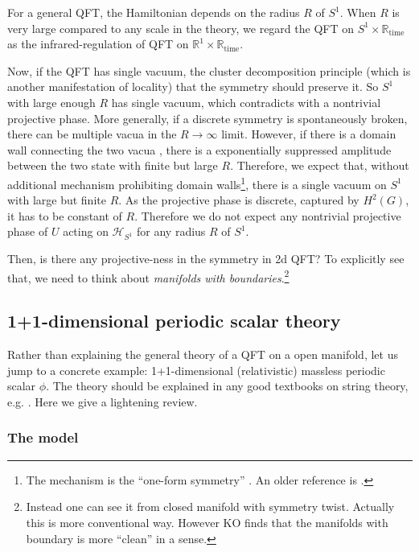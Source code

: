 \documentclass[
]{scrartcl}
\numberwithin{equation}{section}
\theoremstyle{definition}
\theoremstyle{definition}
\theoremstyle{definition}
\theoremstyle{definition}
\theoremstyle{remark}
\begin{document}
For a general QFT, the Hamiltonian depends on the radius \(R\) of \(S^1\).
When \(R\) is very large compared to any scale in the theory, we regard the QFT on \(S^1\times \mathbb{R}_\text{time}\) as the infrared-regulation of QFT on \(\mathbb{R}^1\times \mathbb{R}_\text{time}\).

Now, if the QFT has single vacuum, the cluster decomposition principle (which is another manifestation of locality) that the symmetry should preserve it. So \(S^1\) with large enough \(R\) has single vacuum, which contradicts with a nontrivial projective phase.
More generally, if a discrete symmetry is spontaneously broken,
there can be multiple vacua in the \(R\to \infty\) limit.
However, if there is a domain wall connecting the two vacua , there is a exponentially suppressed
amplitude between the two state with finite but large \(R\).
Therefore, we expect that, without additional mechanism prohibiting domain walls\footnote{The mechanism is the ``one-form symmetry'' \autocite{Komargodski:2020mxz}. An older reference is \autocite{Hellerman:2006zs}.}, there is a single vacuum on \(S^1\) with large but finite \(R\).
As the projective phase is discrete, captured by \(H^2(G)\), it has to be constant of \(R\). Therefore we do not expect any nontrivial projective phase of \(U\) acting on \(\mathcal{H}_{S^1}\) for any radius \(R\) of \(S^1\).

Then, is there any projective-ness in the symmetry in 2d QFT?
To explicitly see that, we need to think about \emph{manifolds with boundaries}.\footnote{Instead one can see it from closed manifold with symmetry twist. Actually this is more conventional way. However KO finds that the manifolds with boundary is more ``clean'' in a sense.}

\hypertarget{dimensional-periodic-scalar-theory}{%
\subsection{1+1-dimensional periodic scalar theory}\label{dimensional-periodic-scalar-theory}}

Rather than explaining the general theory of a QFT on a open manifold, let us jump to a concrete example: 1+1-dimensional (relativistic) massless periodic scalar \(\phi\).
The theory should be explained in any good textbooks on string theory, e.g. \textcite{PolchinskiVol1}. Here we give a lightening review.

\hypertarget{the-model}{%
\subsubsection{The model}\label{the-model}}
\end{document}
